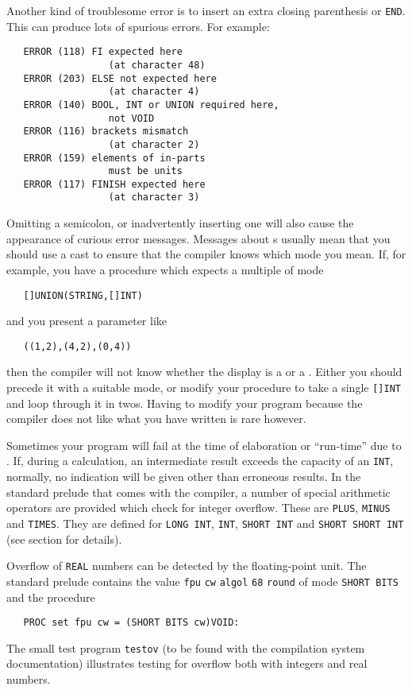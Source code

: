 Another kind of troublesome error is to insert an extra closing
parenthesis or \verb|END|. This can produce lots of spurious errors.
For example:
\begin{verbatim}
   ERROR (118) FI expected here
                  (at character 48)
   ERROR (203) ELSE not expected here
                  (at character 4)
   ERROR (140) BOOL, INT or UNION required here,
                  not VOID
   ERROR (116) brackets mismatch
                  (at character 2)
   ERROR (159) elements of in-parts
                  must be units
   ERROR (117) FINISH expected here
                  (at character 3)
\end{verbatim}
\noindent
Omitting a semicolon, or inadvertently inserting one will also cause
the appearance of curious error messages. Messages about
s usually mean that you should use a
cast to ensure that the compiler knows which mode you mean. If, for
example, you have a procedure which expects a multiple of mode
\begin{verbatim}
   []UNION(STRING,[]INT)
\end{verbatim}
\noindent
and you present a parameter like
\begin{verbatim}
   ((1,2),(4,2),(0,4))
\end{verbatim}
\noindent
then the compiler will not know whether the display is a
 or a
.  Either you should precede
it with a suitable mode, or modify your procedure to take a single
\verb|[]INT| and loop through it in twos.  Having to modify your
program because the compiler does not like what you have written is
rare however.

\pagebreak
{}
Sometimes your program will fail at the time of elaboration or
``run-time'' due to .
If, during a calculation, an intermediate result exceeds the capacity
of an \verb|INT|, normally, no indication will be given other than
erroneous results. In the standard prelude that comes with the
 compiler, a number of special
arithmetic operators are provided which check for integer overflow.
These are \verb|PLUS|, \verb|MINUS| and \verb|TIMES|. They are
defined for \verb|LONG INT|, \verb|INT|, \verb|SHORT INT| and
\verb|SHORT SHORT INT| (see section  for details).

Overflow of \verb|REAL| numbers can be detected by the floating-point
unit. The standard prelude contains the value \verb|fpu| \verb|cw|
\verb|algol| \verb|68| \verb|round| of mode \verb|SHORT BITS| and the
procedure
\begin{verbatim}
   PROC set fpu cw = (SHORT BITS cw)VOID:
\end{verbatim}
\noindent
The small test program \verb|testov| (to be found with the
 compilation system documentation)
illustrates testing for overflow both with integers and real numbers.

